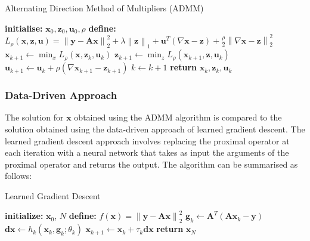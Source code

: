 \documentclass[11pt]{article}
\begin{document}
\begin{algorithm}[H]
\caption{Alternating Direction Method of Multipliers (ADMM)}
\begin{algorithmic}[1]
\State \textbf{initialise:} $\mathbf{x}_0, \mathbf{z}_0, \mathbf{u}_0, \rho$
\State \textbf{define:} $L_\rho(\mathbf{x}, \mathbf{z}, \mathbf{u}) = \left\| \mathbf{y} - \mathbf{A} \mathbf{x} \right\|_2^2 + \lambda \left\| \mathbf{z} \right\|_1 + \mathbf{u}^T (\nabla \mathbf{x}-\mathbf{z})+\frac{\rho}{2} \left\| \nabla \mathbf{x} - \mathbf{z}\right\|_2^2$  
    \State $\mathbf{x}_{k+1} \gets \min_x L_\rho(\mathbf{x}, \mathbf{z}_k, \mathbf{u}_k)$ 
    \State $\mathbf{z}_{k+1} \gets \min_z L_\rho(\mathbf{x}_{k+1}, \mathbf{z}, \mathbf{u}_k)$ 
    \State $\mathbf{u}_{k+1} \gets \mathbf{u}_k + \rho (\nabla \mathbf{x}_{k+1} - \mathbf{z}_{k+1})$ 
    \State $k \gets k + 1$
\EndWhile
\State \textbf{return} $\mathbf{x}_k, \mathbf{z}_k, \mathbf{u}_k$
\end{algorithmic}
\end{algorithm}

\subsubsection{Data-Driven Approach}
The solution for \( \mathbf{x} \) obtained using the ADMM algorithm is compared to the solution obtained using the data-driven approach of learned gradient descent. The learned gradient descent approach involves replacing the proximal operator at each iteration with a neural network that takes as input the arguments of the proximal operator and returns the output. The algorithm can be summarised as follows:


\begin{algorithm}[H]
    \caption{Learned Gradient Descent}
    \begin{algorithmic}[1]
    \State \textbf{initialize:} $\mathbf{x}_0$, $N$
    \State \textbf{define:} $f(\mathbf{x}) = \left\| \mathbf{y} - \mathbf{A} \mathbf{x} \right\|_2^2$ 
        \State $\mathbf{g}_k \gets \mathbf{A}^T(\mathbf{A}\mathbf{x}_k - \mathbf{y})$ 
        \State $\mathbf{dx} \gets h_k(\mathbf{x}_k, \mathbf{g}_k; \theta_k)$ 
        \State $\mathbf{x}_{k+1} \gets \mathbf{x}_k + \tau_k \mathbf{dx}$ 
    \EndFor
    \State \textbf{return} $\mathbf{x}_N$
    \end{algorithmic}
    \end{algorithm}
\end{document}
